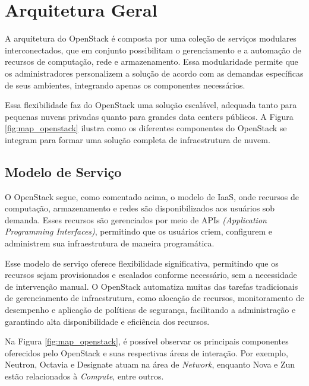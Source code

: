 \section{Arquitetura Geral}

A arquitetura do OpenStack é composta por uma coleção de serviços modulares interconectados, que em conjunto possibilitam o gerenciamento e a automação de recursos de computação, rede e armazenamento. Essa modularidade permite que os administradores personalizem a solução de acordo com as demandas específicas de seus ambientes, integrando apenas os componentes necessários.

Essa flexibilidade faz do OpenStack uma solução escalável, adequada tanto para pequenas nuvens privadas quanto para grandes data centers públicos. A Figura \ref{fig:map_openstack} ilustra como os diferentes componentes do OpenStack se integram para formar uma solução completa de infraestrutura de nuvem.

\subsection{Modelo de Serviço}
O OpenStack segue, como comentado acima, o modelo de IaaS, onde recursos de computação, armazenamento e redes são disponibilizados aos usuários sob demanda. Esses recursos são gerenciados por meio de APIs \textit{(Application Programming Interfaces)}, permitindo que os usuários criem, configurem e administrem sua infraestrutura de maneira programática.

Esse modelo de serviço oferece flexibilidade significativa, permitindo que os recursos sejam provisionados e escalados conforme necessário, sem a necessidade de intervenção manual. O OpenStack automatiza muitas das tarefas tradicionais de gerenciamento de infraestrutura, como alocação de recursos, monitoramento de desempenho e aplicação de políticas de segurança, facilitando a administração e garantindo alta disponibilidade e eficiência dos recursos.

Na Figura \ref{fig:map_openstack}, é possível observar os principais componentes oferecidos pelo OpenStack e suas respectivas áreas de interação. Por exemplo, Neutron, Octavia e Designate atuam na área de \textit{Network}, enquanto Nova e Zun estão relacionados à \textit{Compute}, entre outros.


